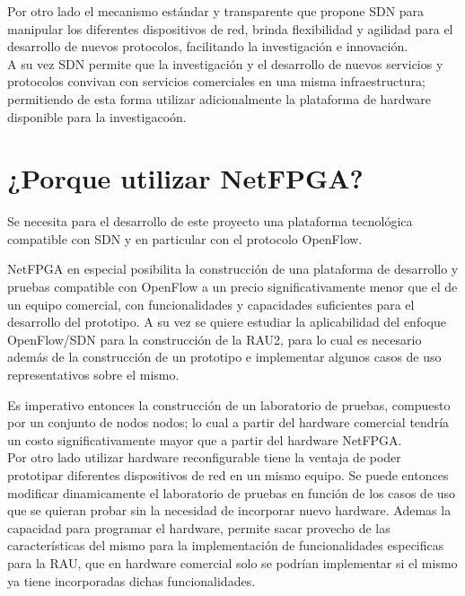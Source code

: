 Por otro lado el mecanismo estándar y transparente que propone SDN para manipular los diferentes dispositivos de red, brinda flexibilidad y agilidad para el desarrollo de nuevos protocolos, facilitando la investigaci\'on e innovaci\'on.\\

A su vez SDN permite que la investigaci\'on y el desarrollo de nuevos servicios y protocolos convivan con servicios comerciales en una misma infraestructura; permitiendo de esta forma utilizar adicionalmente la plataforma de hardware disponible para la investigaco\'on. 


\section[¿Por qu\'e utilizar NetFPGA?]{¿Porque utilizar NetFPGA?}

Se necesita para el desarrollo de este proyecto una plataforma tecnol\'ogica compatible con SDN y en particular con el protocolo OpenFlow.

NetFPGA en especial posibilita la construcci\'on de una plataforma de desarrollo y pruebas compatible con OpenFlow a un precio significativamente menor que el de un equipo comercial, con funcionalidades y capacidades suficientes para el desarrollo del prototipo. A su vez se quiere estudiar la aplicabilidad del enfoque OpenFlow/SDN para la construcción de la RAU2, para lo cual es necesario adem\'as de la construcción de un prototipo e implementar algunos casos de uso representativos sobre el mismo. 

Es imperativo entonces la construcción de un laboratorio de pruebas, compuesto por un conjunto de nodos nodos; lo cual a partir del hardware comercial tendría un costo significativamente mayor que a partir del hardware NetFPGA.\\

Por otro lado utilizar hardware reconfigurable tiene la ventaja de poder prototipar diferentes dispositivos de red en un mismo equipo. Se puede entonces modificar dinamicamente el laboratorio de pruebas en función de los casos de uso que se quieran probar sin la necesidad de incorporar nuevo hardware. Ademas la capacidad para programar el hardware, permite sacar provecho de las características del mismo para la implementaci\'on de funcionalidades especificas para la RAU, que en hardware comercial solo se podrían implementar si el mismo ya tiene incorporadas dichas funcionalidades.\\

